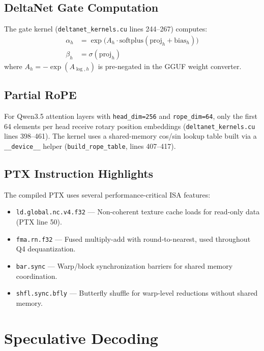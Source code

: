 \documentclass[11pt]{article}
\begin{document}
\subsection{DeltaNet Gate Computation}

The gate kernel (\texttt{deltanet\_kernels.cu} lines 244--267) computes:
\begin{align}
\alpha_h &= \exp\!\bigl(A_h \cdot \text{softplus}(\text{proj}_h + \text{bias}_h)\bigr) \\
\beta_h &= \sigma(\text{proj}_h)
\end{align}
where $A_h = -\exp(A_{\log,h})$ is pre-negated in the GGUF weight converter.

\subsection{Partial RoPE}

For Qwen3.5 attention layers with \texttt{head\_dim=256} and \texttt{rope\_dim=64},
only the first 64 elements per head receive rotary position embeddings
(\texttt{deltanet\_kernels.cu} lines 398--461). The kernel uses a shared-memory
cos/sin lookup table built via a \texttt{\_\_device\_\_} helper
(\texttt{build\_rope\_table}, lines 407--417).

\subsection{PTX Instruction Highlights}

The compiled PTX uses several performance-critical ISA features:
\begin{itemize}
  \item \texttt{ld.global.nc.v4.f32} --- Non-coherent texture cache loads for
        read-only data (PTX line 50).
  \item \texttt{fma.rn.f32} --- Fused multiply-add with round-to-nearest,
        used throughout Q4 dequantization.
  \item \texttt{bar.sync} --- Warp/block synchronization barriers for shared
        memory coordination.
  \item \texttt{shfl.sync.bfly} --- Butterfly shuffle for warp-level reductions
        without shared memory.
\end{itemize}

\section{Speculative Decoding}
\label{sec:spec-decode}
\end{document}
